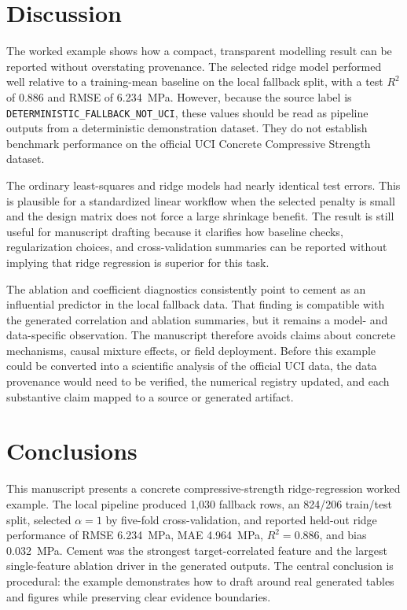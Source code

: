 \section{Discussion}
\label{sec:discussion}

The worked example shows how a compact, transparent modelling result can be reported without overstating provenance. The selected ridge model performed well relative to a training-mean baseline on the local fallback split, with a test \(R^2\) of 0.886 and RMSE of 6.234~MPa. However, because the source label is \texttt{DETERMINISTIC\_FALLBACK\_NOT\_UCI}, these values should be read as pipeline outputs from a deterministic demonstration dataset. They do not establish benchmark performance on the official UCI Concrete Compressive Strength dataset.

The ordinary least-squares and ridge models had nearly identical test errors. This is plausible for a standardized linear workflow when the selected penalty is small and the design matrix does not force a large shrinkage benefit. The result is still useful for manuscript drafting because it clarifies how baseline checks, regularization choices, and cross-validation summaries can be reported without implying that ridge regression is superior for this task.

The ablation and coefficient diagnostics consistently point to cement as an influential predictor in the local fallback data. That finding is compatible with the generated correlation and ablation summaries, but it remains a model- and data-specific observation. The manuscript therefore avoids claims about concrete mechanisms, causal mixture effects, or field deployment. Before this example could be converted into a scientific analysis of the official UCI data, the data provenance would need to be verified, the numerical registry updated, and each substantive claim mapped to a source or generated artifact.

\section{Conclusions}
\label{sec:conclusions}

This manuscript presents a concrete compressive-strength ridge-regression worked example. The local pipeline produced 1,030 fallback rows, an 824/206 train/test split, selected \(\alpha = 1\) by five-fold cross-validation, and reported held-out ridge performance of RMSE 6.234~MPa, MAE 4.964~MPa, \(R^2 = 0.886\), and bias 0.032~MPa. Cement was the strongest target-correlated feature and the largest single-feature ablation driver in the generated outputs. The central conclusion is procedural: the example demonstrates how to draft around real generated tables and figures while preserving clear evidence boundaries.

